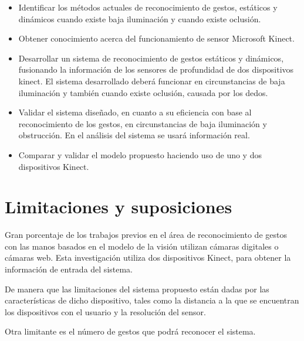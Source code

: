 \begin{itemize}
	\item Identificar los m\'etodos actuales de reconocimiento de gestos, estáticos y din\'amicos cuando existe baja iluminación  y cuando existe oclusión. 
	
	\item  Obtener conocimiento acerca del funcionamiento de sensor Microsoft Kinect.
	
	\item Desarrollar un sistema de reconocimiento de gestos estáticos y dinámicos, fusionando la información de los sensores de  profundidad de dos dispositivos kinect. El sistema desarrollado deberá funcionar en circunstancias de baja iluminación y también cuando existe oclusión, causada por los dedos. 
	
	\item Validar el sistema dise\~nado, en cuanto a su eficiencia con base al reconocimiento de los gestos, en circunstancias de baja iluminación y obstrucción. En el análisis del sistema se usar\'a información real.  
	
	\item Comparar y validar el modelo propuesto haciendo uso de uno y dos dispositivos Kinect. 
\end{itemize}




\section{Limitaciones y suposiciones}\label{sec:Limitaciones&Suposiciones}

Gran porcentaje de los trabajos previos en el \'area de reconocimiento de gestos con las manos basados en el modelo de la visión  utilizan c\'amaras digitales o c\'amaras web. Esta investigación utiliza dos dispositivos Kinect, para obtener la información de entrada del sistema.

De  manera que las limitaciones del sistema propuesto están dadas por las características de dicho dispositivo, tales como la distancia  a la que se encuentran los dispositivos con el usuario y la resolución del sensor. 

Otra limitante es el número de gestos que podrá reconocer el sistema.




